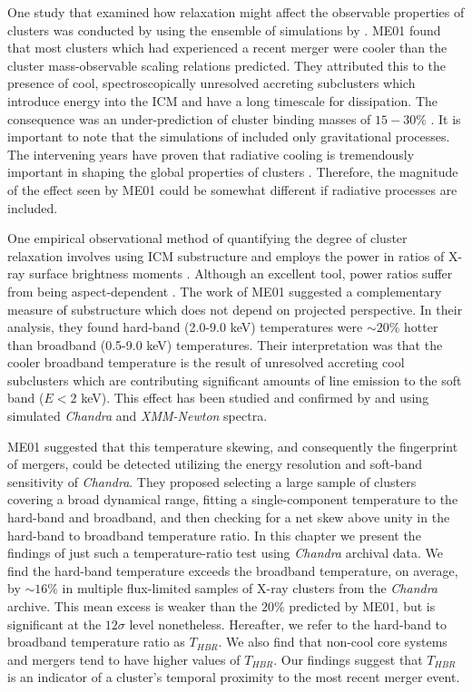 One study that examined how relaxation might affect the observable
properties of clusters was conducted by \citep[][hereafter
  ME01]{2001ApJ...546..100M} using the ensemble of simulations by
\citet{1997ApJ...491...38M}. ME01 found that most clusters which had
experienced a recent merger were cooler than the cluster
mass-observable scaling relations predicted. They attributed this to
the presence of cool, spectroscopically unresolved accreting
subclusters which introduce energy into the ICM and have a long
timescale for dissipation. The consequence was an under-prediction of
cluster binding masses of $15-30\%$ \citep{2001ApJ...546..100M}. It is
important to note that the simulations of \citet{1997ApJ...491...38M}
included only gravitational processes. The intervening years have
proven that radiative cooling is tremendously important in shaping the
global properties of clusters \citep[\eg][]{2004ApJ...613..811M,
  2006MNRAS.373..881P, nagai07}. Therefore, the magnitude of the
effect seen by ME01 could be somewhat different if radiative processes
are included.

One empirical observational method of quantifying the degree of
cluster relaxation involves using ICM substructure and employs the
power in ratios of X-ray surface brightness moments
\citep{1995ApJ...452..522B, 1996ApJ...458...27B,
  2005ApJ...624..606J}. Although an excellent tool, power ratios
suffer from being aspect-dependent \citep{2008ApJ...681..167J,
  VV08}. The work of ME01 suggested a complementary measure of
substructure which does not depend on projected perspective. In their
analysis, they found hard-band (2.0-9.0 keV) temperatures were $\sim
20\%$ hotter than broadband (0.5-9.0 keV) temperatures. Their
interpretation was that the cooler broadband temperature is the result
of unresolved accreting cool subclusters which are contributing
significant amounts of line emission to the soft band ($E < 2$
keV). This effect has been studied and confirmed by
\citet{2004MNRAS.354...10M} and \citet{2006ApJ...640..710V} using
simulated {\it Chandra} and {\it{XMM-Newton}} spectra.

ME01 suggested that this temperature skewing, and consequently the
fingerprint of mergers, could be detected utilizing the energy
resolution and soft-band sensitivity of {\it Chandra}. They proposed
selecting a large sample of clusters covering a broad dynamical range,
fitting a single-component temperature to the hard-band and broadband,
and then checking for a net skew above unity in the hard-band to
broadband temperature ratio. In this chapter we present the findings of
just such a temperature-ratio test using {\it Chandra} archival
data. We find the hard-band temperature exceeds the broadband
temperature, on average, by $\sim16\%$ in multiple flux-limited
samples of X-ray clusters from the {\it Chandra} archive. This mean
excess is weaker than the $20\%$ predicted by ME01, but is significant
at the $12\sigma$ level nonetheless. Hereafter, we refer to the
hard-band to broadband temperature ratio as $T_{HBR}$. We also find
that non-cool core systems and mergers tend to have higher values of
$T_{HBR}$. Our findings suggest that $T_{HBR}$ is an indicator of a
cluster's temporal proximity to the most recent merger event.

